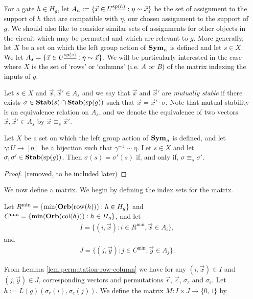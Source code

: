 \documentclass[../paper.tex]{subfiles}
\begin{document}
For a gate $h \in H_g$, let $A_h := \{\vec{x} \in U^{\underline{\text{sp}(h)}} :
\eta \sim \vec{x}\}$ be the set of assignment to the support of $h$ that are
compatible with $\eta$, our chosen assignment to the support of $g$. We should
also like to consider similar sets of assignments for other objects in the
circuit which may be permuted and which are relevant to $g$. More generally, let
$X$ be a set on which the left group action of $\text{\textbf{Sym}}_n$ is defined and let $s
\in X$. We let $A_s = \{\vec{x} \in U^{\underline{\text{sp}(s)}} : \eta \sim
\vec{x}\}$. We will be particularly interested in the case where $X$ is the set
of `rows' or `columns' (i.e. $A$ or $B$) of the matrix indexing the inputs of
$g$.

Let $s \in X$ and $\vec{x}, \vec{x}' \in A_s$ and we say that $\vec{x}$ and
$\vec{x}'$ are \emph{mutually stable} if there exists $\sigma \in \text{\textbf{Stab}}(s) \cap
\text{\textbf{Stab}} (\text{sp} (g))$ such that $\vec{x} = \vec{x}' \cdot \sigma$. Note that mutual
stability is an equivalence relation on $A_s$, and we denote the equivalence of
two vectors $\vec{x}, \vec{x}' \in A_s$ by $\vec{x} \equiv_s \vec{x}'$.

\begin{lem}
  Let $X$ be a set on which the left group action of $\text{\textbf{Sym}}_n$ is defined, and
  let $\gamma: U \rightarrow [n]$ be a bijection such that $\gamma^{-1} \sim
  \eta$. Let $s \in X$ and let $\sigma, \sigma' \in \text{\textbf{Stab}}(\text{sp}(g))$. Then
  $\sigma(s) = \sigma' (s)$ if, and only if, $\sigma \equiv_s \sigma'$.
  \label{lem:functions-well-defined}
\end{lem}

\begin{proof}
  (removed, to be included later)
\end{proof}

We now define a matrix. We begin by defining the index sets for the matrix.

Let $R^{\min} = \{\min (\text{\textbf{Orb}}(\text{row}(h))) : h \in H_g\}$ and $C^{\min} = \{ \min
(\text{\textbf{Orb}} (\text{col}(h))) : h \in H_g\}$, and let
\begin{align*}
  I = \{(i, \vec{x}): i \in R^{\min}, \vec{x} \in A_i\},
\end{align*}
and
\begin{align*}
  J = \{(j, \vec{y}): j \in C^{\min}, \vec{y} \in A_j\}.
\end{align*}

From Lemma \ref{lem:permutation-row-column} we have for any $(i, \vec{x}) \in I$
and $(j, \vec{y}) \in J$, corresponding vectors and permutations $\vec{r}$,
$\vec{c}$, $\sigma_r$ and $\sigma_c$. Let $h := L(g)(\sigma_r(i), \sigma_c
(j))$. We define the matrix $M : I \times J \rightarrow \{0,1\}$ by
\end{document}
